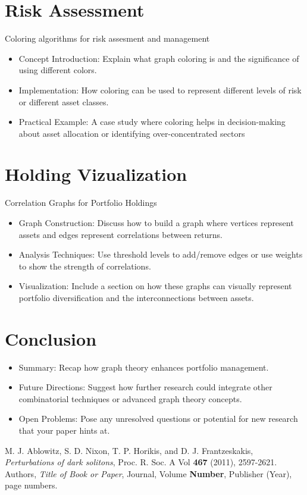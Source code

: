 \documentclass{article}
\begin{document}
\section{Risk Assessment}
Coloring algorithms for risk assesment and management

\begin{itemize}
    \item Concept Introduction: Explain what graph coloring is and the significance of using different colors.
    \item Implementation: How coloring can be used to represent different levels of risk or different asset classes.
    \item Practical Example: A case study where coloring helps in decision-making about asset allocation or identifying over-concentrated sectors
\end{itemize}


\section{Holding Vizualization}

Correlation Graphs for Portfolio Holdings

\begin{itemize}
    \item Graph Construction: Discuss how to build a graph where vertices represent assets and edges represent correlations between returns.
    \item Analysis Techniques: Use threshold levels to add/remove edges or use weights to show the strength of correlations.
    \item Visualization: Include a section on how these graphs can visually represent portfolio diversification and the interconnections between assets.
\end{itemize}


\section{Conclusion}

\begin{itemize}
    \item Summary: Recap how graph theory enhances portfolio management.
    \item Future Directions: Suggest how further research could integrate other combinatorial techniques or advanced graph theory concepts.
    \item Open Problems: Pose any unresolved questions or potential for new research that your paper hints at.
\end{itemize}



\begin{thebibliography}{99}
    M. J. Ablowitz, S. D. Nixon, T. P. Horikis, and D. J. Frantzeskakis, \emph{Perturbations of dark solitons}, Proc. R. Soc. A Vol \textbf{467} (2011), 2597-2621.
    Authors, \emph{Title of Book or Paper}, Journal, Volume \textbf{Number}, Publisher (Year), page numbers.
\end{thebibliography}
\end{document}
